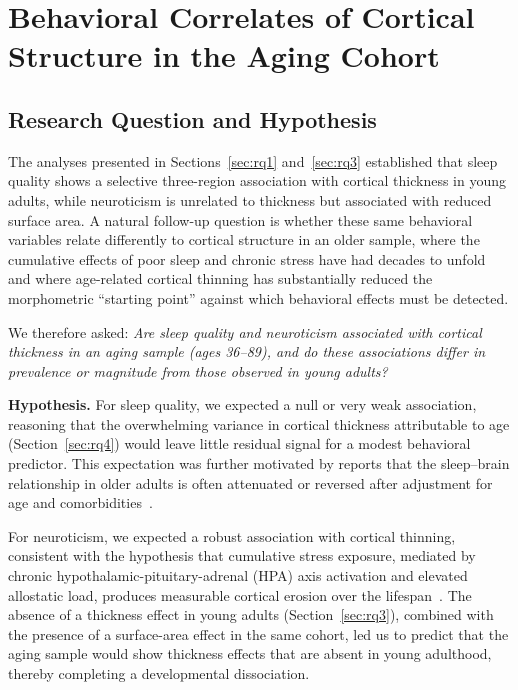 
\section{Behavioral Correlates of Cortical Structure in the Aging Cohort}
\label{sec:rq5}

\subsection{Research Question and Hypothesis}

The analyses presented in Sections~\ref{sec:rq1} and~\ref{sec:rq3} established that sleep quality shows a selective three-region association with cortical thickness in young adults, while neuroticism is unrelated to thickness but associated with reduced surface area.
A natural follow-up question is whether these same behavioral variables relate differently to cortical structure in an older sample, where the cumulative effects of poor sleep and chronic stress have had decades to unfold and where age-related cortical thinning has substantially reduced the morphometric ``starting point'' against which behavioral effects must be detected.

We therefore asked: \textit{Are sleep quality and neuroticism associated with cortical thickness in an aging sample (ages 36--89), and do these associations differ in prevalence or magnitude from those observed in young adults?}

\textbf{Hypothesis.}
For sleep quality, we expected a null or very weak association, reasoning that the overwhelming variance in cortical thickness attributable to age (Section~\ref{sec:rq4}) would leave little residual signal for a modest behavioral predictor.
This expectation was further motivated by reports that the sleep--brain relationship in older adults is often attenuated or reversed after adjustment for age and comorbidities~\cite{spira2016self, lim2013sleep}.

For neuroticism, we expected a robust association with cortical thinning, consistent with the hypothesis that cumulative stress exposure, mediated by chronic hypothalamic-pituitary-adrenal (HPA) axis activation and elevated allostatic load, produces measurable cortical erosion over the lifespan~\cite{lupien2009effects, mcewen2006protective, ottaviani2016physiological}.
The absence of a thickness effect in young adults (Section~\ref{sec:rq3}), combined with the presence of a surface-area effect in the same cohort, led us to predict that the aging sample would show thickness effects that are absent in young adulthood, thereby completing a developmental dissociation.

